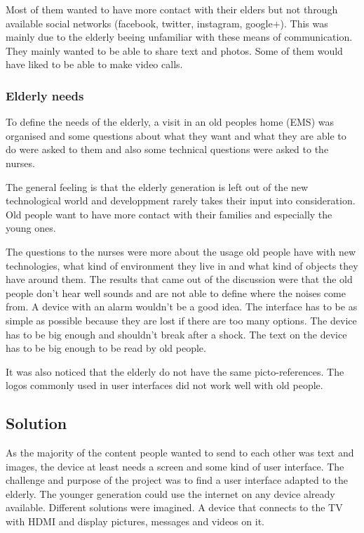 Most of them wanted to have more contact with their elders but not through available social networks (facebook, twitter, instagram, google+). This was mainly due to the elderly beeing unfamiliar with these means of communication.
They mainly wanted to be able to share text and photos. Some of them would have liked to be able to make video calls.

\subsubsection{Elderly needs}
To define the needs of the elderly, a visit in an old peoples home (EMS) was organised and some questions about what they want and what they are able to do were asked to them and also some technical questions were asked to the nurses.

The general feeling is that the elderly generation is left out of the new technological world and developpment rarely takes their input into consideration. Old people want to have more contact with their families and especially the young ones.

The questions to the nurses were more about the usage old people have with new technologies, what kind of environment they live in and what kind of objects they have around them. The results that came out of the discussion were that the old people don’t hear well sounds and are not able to define where the noises come from. A device with an alarm wouldn’t be a good idea. The interface has to be as simple as possible because they are lost if there are too many options. The device has to be big enough and shouldn’t break after a shock. The text on the device has to be big enough to be read by old people.

It was also noticed that the elderly do not have the same picto-references. The logos commonly used in user interfaces did not work well with old people.

\subsection{Solution}
\label{chap: solution}
As the majority of the content people wanted to send to each other was text and images, the device at least needs a screen and some kind of user interface.
The challenge and purpose of the project was to find a user interface adapted to the elderly. The younger generation could use the internet on any device already available.
Different solutions were imagined. A device that connects to the TV with HDMI and display pictures, messages and videos on it.

